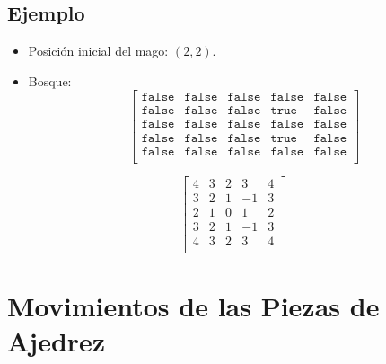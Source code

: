 \subsection*{Ejemplo}

\begin{itemize}
        \item Posición inicial del mago: \((2, 2)\).  
        \item Bosque: 
        \[ 
        \begin{bmatrix}
            \texttt{false} & \texttt{false} & \texttt{false} & \texttt{false} & \texttt{false} \\
            \texttt{false} & \texttt{false} & \texttt{false} & \texttt{true}  & \texttt{false} \\
            \texttt{false} & \texttt{false} & \texttt{false} & \texttt{false} & \texttt{false} \\
            \texttt{false} & \texttt{false} & \texttt{false} & \texttt{true}  & \texttt{false} \\
            \texttt{false} & \texttt{false} & \texttt{false} & \texttt{false} & \texttt{false} \\
            \end{bmatrix}
        \]
\end{itemize}

\[
\begin{bmatrix}
4 & 3 & 2 & 3 & 4 \\
3 & 2 & 1 & -1 & 3 \\
2 & 1 & 0 & 1  & 2 \\
3 & 2 & 1 & -1 & 3 \\
4 & 3 & 2 & 3  & 4 \\
\end{bmatrix}
\]

\section*{Movimientos de las Piezas de Ajedrez}

